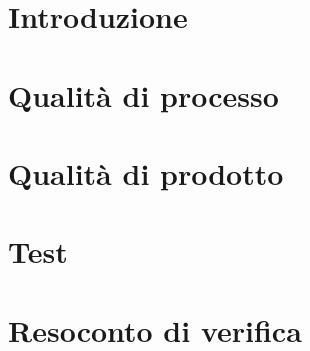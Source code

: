 \documentclass[]{article}
\begin{document}
	
	\newpage
	\tableofcontents
	\newpage
	\listoffigures
	\listoftables
	\newpage

	\section{Introduzione}
	
	\newpage

	\section{Qualità di processo}
	
	\newpage

	\section{Qualità di prodotto}
	
	\newpage

	\section{Test}
	
	\newpage

	\appendix
	\section{Resoconto di verifica}
	
\end{document}
